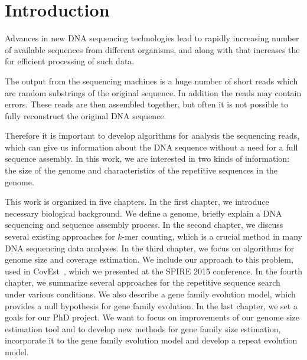 \chapter*{Introduction}

Advances in new DNA sequencing technologies lead to rapidly increasing number of available sequences from different organisms, and along with that increases the for efficient processing of such data.

The output from the sequencing machines is a huge number of short reads which are random substrings of the original sequence. In addition the reads may contain errors.
These reads are then assembled together, but often it is not possible to fully reconstruct the original DNA sequence.

Therefore it is important to develop algorithms for analysis the sequencing reads, which can give us information about the DNA sequence without a need for a full sequence assembly.
In this work, we are interested in two kinds of information: the size of the genome and characteristics of the repetitive sequences in the genome.

This work is organized in five chapters.
In the first chapter, we introduce necessary biological background. We define a genome, briefly explain a DNA sequencing and sequence assembly process.
In the second chapter, we discuss several existing approaches for $k$-mer counting, which is a crucial method in many DNA sequencing data analyses.
In the third chapter, we focus on algorithms for genome size and coverage estimation. We include our approach to this problem, used in CovEst~\cite{covest}, which we presented at the SPIRE 2015 conference.
In the fourth chapter, we summarize several approaches for the repetitive sequence search under various conditions. We also describe a gene family evolution model, which provides a null hypothesis for gene family evolution.
In the last chapter, we set a goals for our PhD project. We want to focus on improvements of our genome size estimation tool and to develop new methods for gene family size estimation, incorporate it to the gene family evolution model and develop a repeat evolution model.
